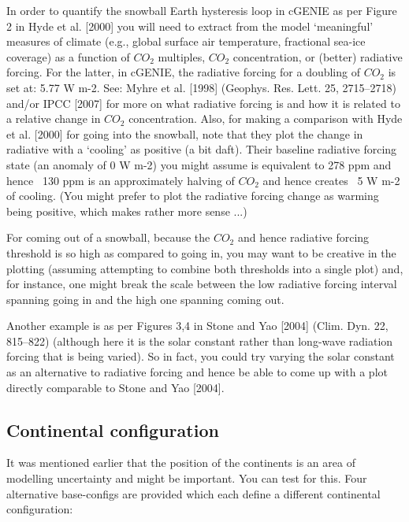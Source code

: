 \documentclass[11pt,fleqn]{book} %
\begin{document}
In order to quantify the snowball Earth hysteresis loop in cGENIE as per Figure 2 in Hyde et al. [2000] you will need to extract from the model ‘meaningful’ measures of climate (e.g., global surface air temperature, fractional sea-ice coverage) as a function of \(CO_{2}\) multiples, \(CO_{2}\) concentration, or (better) radiative forcing. For the latter, in cGENIE, the radiative forcing for a doubling of \(CO_{2}\) is set at: 5.77 W m-2. See: Myhre et al. [1998] (Geophys. Res. Lett. 25, 2715–2718) and/or IPCC [2007] for more on what radiative forcing is and how it is related to a relative change in \(CO_{2}\) concentration. Also, for making a comparison with Hyde et al. [2000] for going into the snowball, note that they plot the change in radiative with a ‘cooling’ as positive (a bit daft). Their baseline radiative forcing state (an anomaly of 0 W m-2) you might assume is equivalent to 278 ppm and hence ~130 ppm is an approximately halving of \(CO_{2}\) and hence creates ~5 W m-2 of cooling. (You might prefer to plot the radiative forcing change as warming being positive, which makes rather more sense ...)

For coming out of a snowball, because the \(CO_{2}\) and hence radiative forcing threshold is so high as compared to going in, you may want to be creative in the plotting (assuming attempting to combine both thresholds into a single plot) and, for instance, one might break the scale between the low radiative forcing interval spanning going in and the high one spanning coming out.

Another example is as per Figures 3,4 in Stone and Yao [2004] (Clim. Dyn. 22, 815–822) (although here it is the solar constant rather than long-wave radiation forcing that is being varied). So in fact, you could try varying the solar constant as an alternative to radiative forcing and hence be able to come up with a plot directly comparable to Stone and Yao [2004].


\subsection{Continental configuration}

It was mentioned earlier that the position of the continents is an area of modelling uncertainty and might be important. You can test for this. Four alternative base-configs are provided which each define a different continental configuration:
\end{document}
